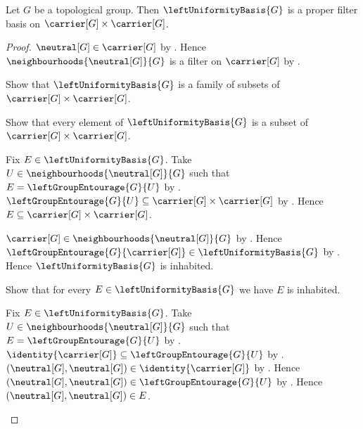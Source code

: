 \begin{theorem}\label{left_uniformity_basis_is_proper_filter_basis}
    Let $G$ be a topological group.
    Then $\leftUniformityBasis{G}$ is a proper filter basis on
        $\carrier[G]\times\carrier[G]$.
\end{theorem}
\begin{proof}
    $\neutral[G]\in\carrier[G]$ by .
    Hence $\neighbourhoods{\neutral[G]}{G}$ is a filter on
        $\carrier[G]$ by .

    Show that $\leftUniformityBasis{G}$ is a family of subsets of
        $\carrier[G]\times\carrier[G]$.
    \begin{subproof}
        Show that every element of $\leftUniformityBasis{G}$ is a subset of
            $\carrier[G]\times\carrier[G]$.
        \begin{subproof}
        Fix $E\in\leftUniformityBasis{G}$.
        Take $U\in\neighbourhoods{\neutral[G]}{G}$ such that
            $E=\leftGroupEntourage{G}{U}$
            by .
        $\leftGroupEntourage{G}{U}
            \subseteq\carrier[G]\times\carrier[G]$
            by .
        Hence $E\subseteq\carrier[G]\times\carrier[G]$.
        \end{subproof}
    \end{subproof}

    $\carrier[G]\in\neighbourhoods{\neutral[G]}{G}$
        by .
    Hence $\leftGroupEntourage{G}{\carrier[G]}
        \in\leftUniformityBasis{G}$
        by .
    Hence $\leftUniformityBasis{G}$ is inhabited.

    Show that for every $E\in\leftUniformityBasis{G}$ we have
        $E$ is inhabited.
    \begin{subproof}
        Fix $E\in\leftUniformityBasis{G}$.
        Take $U\in\neighbourhoods{\neutral[G]}{G}$ such that
            $E=\leftGroupEntourage{G}{U}$ by
            .
        $\identity{\carrier[G]}
            \subseteq\leftGroupEntourage{G}{U}$
            by .
        $(\neutral[G],\neutral[G])
            \in\identity{\carrier[G]}$ by .
        Hence $(\neutral[G],\neutral[G])
            \in\leftGroupEntourage{G}{U}$ by .
        Hence $(\neutral[G],\neutral[G])\in E$.
    \end{subproof}


\end{proof}
